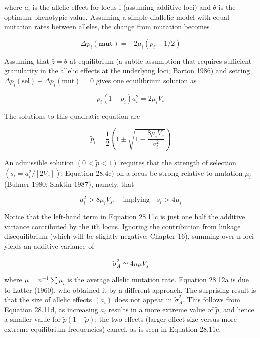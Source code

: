 \documentclass{article}
\begin{document}
where  $ a_{i} $ is the allelic-effect for locus i (assuming additive loci) and  $ \theta $ is the optimum phenotypic value. Assuming a simple diallelic model with equal mutation rates between alleles, the change from mutation becomes

\begin{equation}
\Delta p_{i}(\mathbf{m u t})=-2\mu_{i}(p_{i}-1/2)
\tag{28.11b}
\label{eq:28_11b}
\end{equation}

Assuming that  $ \bar{z} = \theta $ at equilibrium (a subtle assumption that requires sufficient granularity in the allelic effects at the underlying loci; Barton 1986) and setting  $ \Delta p_i(\text{sel}) + \Delta p_i(\text{mut}) = 0 $ gives one equilibrium solution as

\begin{equation}
\widetilde{p}_{i}(1-\widetilde{p}_{i})a_{i}^{2}=2\mu_{i}V_{s}
\tag{28.11c}
\label{eq:28_11c}
\end{equation}

The solutions to this quadratic equation are

\begin{equation}
\widetilde{p}_{i}=\frac{1}{2}\left(1\pm\sqrt{1-\frac{8\mu_{i}V_{s}}{a_{i}^{2}}}\right)
\tag{28.11d}
\label{eq:28_11d}
\end{equation}

An admissible solution  $ (0 < \widetilde{p} < 1) $ requires that the strength of selection  $ (s_i = a_i^2/[2V_s]) $; Equation 28.4c) on a locus be strong relative to mutation  $ \mu_i $ (Bulmer 1980; Slaktin 1987), namely, that

\begin{equation}
a_{i}^{2}>8\mu_{i}V_{s},\quad\mathrm{i m p l y i n g}\quad s_{i}>4\mu_{i}
\tag{28.11e}
\label{eq:28_11e}
\end{equation}

Notice that the left-hand term in Equation 28.11c is just one half the additive variance contributed by the ith locus. Ignoring the contribution from linkage disequilibrium (which will be slightly negative; Chapter 16), summing over n loci yields an additive variance of

\begin{equation}
\widetilde{\sigma}_{A}^{2}\simeq4n\overline{{\mu}}V_{s}
\tag{28.12a}
\label{eq:28_12a}
\end{equation}

where  $ \overline{\mu} = n^{-1} \sum \mu_i $ is the average allelic mutation rate. Equation 28.12a is due to Latter (1960), who obtained it by a different approach. The surprising result is that the size of allelic effects  $ (a_i) $ does not appear in  $ \widetilde{\sigma}_A^2 $. This follows from Equation 28.11d, as increasing  $ a_i $ results in a more extreme value of  $ \widetilde{p} $, and hence a smaller value for  $ \widetilde{p}(1 - \widetilde{p}) $; the two effects (larger effect size versus more extreme equilibrium frequencies) cancel, as is seen in Equation 28.11c.
\end{document}
